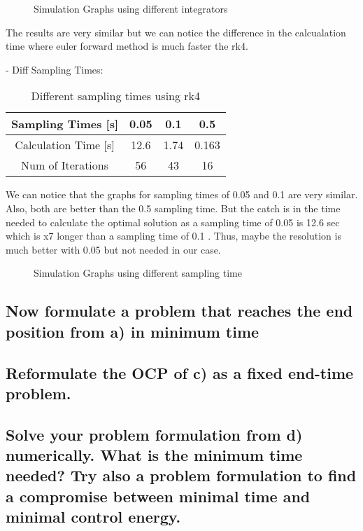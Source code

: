 \documentclass[a4paper, 12pt]{report}
\begin{document}
\begin{figure}[H]
    \centering
    
    \vspace{-110pt} 
    \caption{Simulation Graphs using different integrators}
    \label{fig:integrators}
\end{figure}
The results are very similar but we can notice the difference in the calcualation time where euler forward method is much faster the rk4.

- Diff Sampling Times:
\begin{table}[h]
    \centering
    \begin{tabular}{|c|c|c|c|}
        \hline
        Sampling Times [s] & 0.05 & 0.1 & 0.5 \\
        \hline
        Calculation Time [s] & 12.6 & 1.74 & 0.163 \\
        Num of Iterations &56 & 43 &16 \\
        \hline
    \end{tabular}
    \caption{Different sampling times using rk4}
    \label{tab:my_label}
\end{table}
We can notice that the graphs for sampling times of 0.05 and 0.1 are very similar. Also, both are better than the 0.5 sampling time. But the catch is in the time needed to calculate the optimal solution as a sampling time of 0.05 is 12.6 sec which is x7 longer than a sampling time of 0.1 . Thus, maybe the resolution is much better with 0.05 but not needed in our case.
\begin{figure}[H]
    \centering
    
    \vspace{-180pt} 
    \caption{Simulation Graphs using different sampling time}
    \label{fig:integrators}
\end{figure}

\subsection{Now formulate a problem that reaches the end position from a) in minimum time}
\subsection{Reformulate the OCP of c) as a fixed end-time problem.}
\subsection{Solve your problem formulation from d) numerically. What is the minimum time needed? Try also a problem formulation to find a compromise between minimal time and minimal control energy.}
\end{document}
